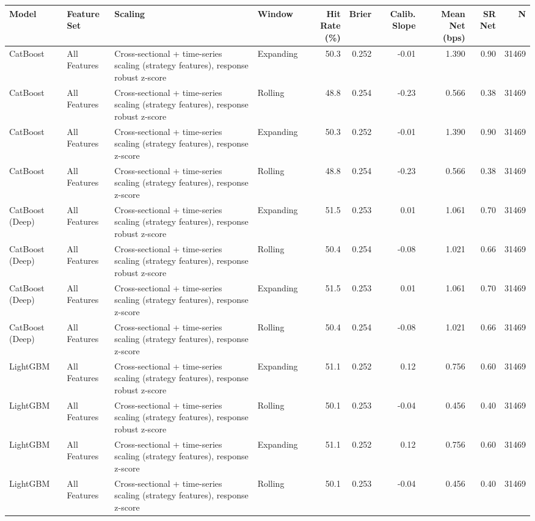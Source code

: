 \begin{tabular}{llllrrrrrr}
\toprule
Model & Feature Set & Scaling & Window & Hit Rate (\%) & Brier & Calib. Slope & Mean Net (bps) & SR Net & N \\
\midrule
CatBoost & All Features & Cross-sectional + time-series scaling (strategy features), response robust z-score & Expanding & 50.3 & 0.252 & -0.01 & 1.390 & 0.90 & 31469 \\
CatBoost & All Features & Cross-sectional + time-series scaling (strategy features), response robust z-score & Rolling & 48.8 & 0.254 & -0.23 & 0.566 & 0.38 & 31469 \\
CatBoost & All Features & Cross-sectional + time-series scaling (strategy features), response z-score & Expanding & 50.3 & 0.252 & -0.01 & 1.390 & 0.90 & 31469 \\
CatBoost & All Features & Cross-sectional + time-series scaling (strategy features), response z-score & Rolling & 48.8 & 0.254 & -0.23 & 0.566 & 0.38 & 31469 \\
CatBoost (Deep) & All Features & Cross-sectional + time-series scaling (strategy features), response robust z-score & Expanding & 51.5 & 0.253 & 0.01 & 1.061 & 0.70 & 31469 \\
CatBoost (Deep) & All Features & Cross-sectional + time-series scaling (strategy features), response robust z-score & Rolling & 50.4 & 0.254 & -0.08 & 1.021 & 0.66 & 31469 \\
CatBoost (Deep) & All Features & Cross-sectional + time-series scaling (strategy features), response z-score & Expanding & 51.5 & 0.253 & 0.01 & 1.061 & 0.70 & 31469 \\
CatBoost (Deep) & All Features & Cross-sectional + time-series scaling (strategy features), response z-score & Rolling & 50.4 & 0.254 & -0.08 & 1.021 & 0.66 & 31469 \\
LightGBM & All Features & Cross-sectional + time-series scaling (strategy features), response robust z-score & Expanding & 51.1 & 0.252 & 0.12 & 0.756 & 0.60 & 31469 \\
LightGBM & All Features & Cross-sectional + time-series scaling (strategy features), response robust z-score & Rolling & 50.1 & 0.253 & -0.04 & 0.456 & 0.40 & 31469 \\
LightGBM & All Features & Cross-sectional + time-series scaling (strategy features), response z-score & Expanding & 51.1 & 0.252 & 0.12 & 0.756 & 0.60 & 31469 \\
LightGBM & All Features & Cross-sectional + time-series scaling (strategy features), response z-score & Rolling & 50.1 & 0.253 & -0.04 & 0.456 & 0.40 & 31469 \\

\end{tabular}
